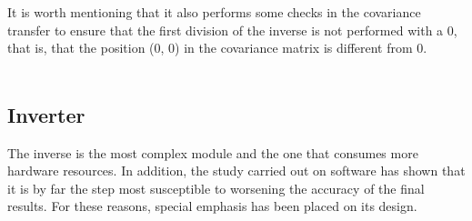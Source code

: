 It is worth mentioning that it also performs some checks in the covariance transfer to ensure that the first division of the inverse is not performed with a 0, that is, that the position (0, 0) in the covariance matrix is different from 0.
\\
\\
%
%
%
%
%
%
%

\subsection{Inverter}
The inverse is the most complex module and the one that consumes more hardware resources. In addition, the study carried out on software has shown that it is by far the step most susceptible to worsening the accuracy of the final results. For these reasons, special emphasis has been placed on its design.

